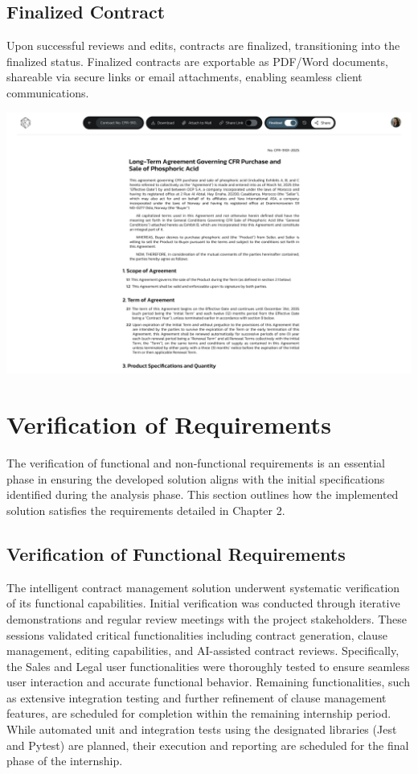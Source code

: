 \subsection{Finalized Contract}
Upon successful reviews and edits, contracts are finalized, transitioning into the finalized status. Finalized contracts are exportable as PDF/Word documents, shareable via secure links or email attachments, enabling seamless client communications.

\begin{center}
    \centering
    \includegraphics[width=1\textwidth]{Images/Contract Status - Finalized.png}
    \label{fig:contract_status_finalized}
\end{center}

\section{Verification of Requirements}
The verification of functional and non-functional requirements is an essential phase in ensuring the developed solution aligns with the initial specifications identified during the analysis phase. This section outlines how the implemented solution satisfies the requirements detailed in Chapter 2.

\subsection{Verification of Functional Requirements}
The intelligent contract management solution underwent systematic verification of its functional capabilities. Initial verification was conducted through iterative demonstrations and regular review meetings with the project stakeholders. These sessions validated critical functionalities including contract generation, clause management, editing capabilities, and AI-assisted contract reviews. Specifically, the Sales and Legal user functionalities were thoroughly tested to ensure seamless user interaction and accurate functional behavior. Remaining functionalities, such as extensive integration testing and further refinement of clause management features, are scheduled for completion within the remaining internship period. While automated unit and integration tests using the designated libraries (Jest and Pytest) are planned, their execution and reporting are scheduled for the final phase of the internship.

